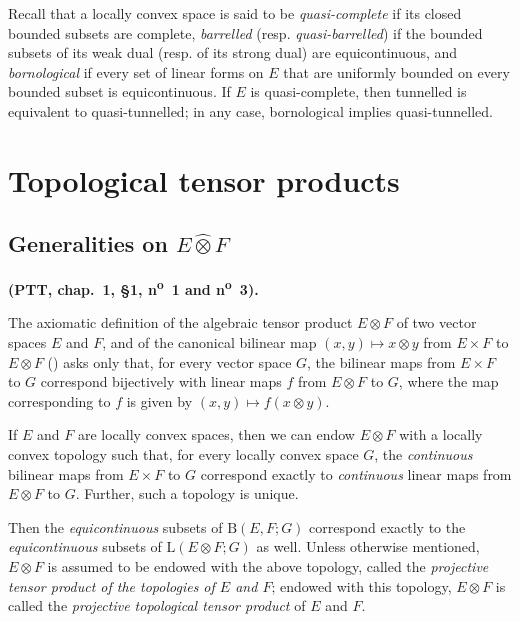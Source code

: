 \documentclass{article}
\theoremstyle{plain}
\newenvironment{theorem}[1]
    {\renewcommand\theinnercustomtheorem{#1}\innercustomtheorem}
    {\endinnercustomtheorem}
\newcommand{\BB}{\mathrm{B}}
\newcommand{\LL}{\mathrm{L}}
\newcommand{\hotimes}{\widehat{\otimes}}
\newcommand{\oldpage}[1]{\marginpar{\footnotesize$\Big\vert$ \textit{p.~#1}}}
\begin{document}
Recall that a locally convex space is said to be \emph{quasi-complete} if its closed bounded subsets are complete, \emph{barrelled} (resp. \emph{quasi-barrelled}) if the bounded subsets of its weak dual (resp. of its strong dual) are equicontinuous, and \emph{bornological} if every set of linear forms on $E$ that are uniformly bounded on every bounded subset is equicontinuous.
If $E$ is quasi-complete, then tunnelled is equivalent to quasi-tunnelled;
in any case, bornological implies quasi-tunnelled.



\section{Topological tensor products}
\label{section:topological-tensor-products}
\oldpage{76}

\subsection{Generalities on \texorpdfstring{$E\hotimes F$}{EF}}
\label{subsection:generalities-on-E-hotimes-F}

\textbf{(PTT, chap.~1, §1, n\textsuperscript{o}~1 and n\textsuperscript{o}~3).}

The axiomatic definition of the algebraic tensor product $E\otimes F$ of two vector spaces $E$ and $F$, and of the canonical bilinear map $(x,y)\mapsto x\otimes y$ from $E\times F$ to $E\otimes F$ (\cite{1}) asks only that, for every vector space $G$, the bilinear maps from $E\times F$ to $G$ correspond bijectively with linear maps $f$ from $E\otimes F$ to $G$, where the map corresponding to $f$ is given by $(x,y)\mapsto f(x\otimes y)$.

\begin{theorem}{1}
\label{theorem1}
  If $E$ and $F$ are locally convex spaces, then we can endow $E\otimes F$ with a locally convex topology such that, for every locally convex space $G$, the \emph{continuous} bilinear maps from $E\times F$ to $G$ correspond exactly to \emph{continuous} linear maps from $E\otimes F$ to $G$.
  Further, such a topology is unique.
\end{theorem}

Then the \emph{equicontinuous} subsets of $\BB(E,F;G)$ correspond exactly to the \emph{equicontinuous} subsets of $\LL(E\otimes F;G)$ as well.
Unless otherwise mentioned, $E\otimes F$ is assumed to be endowed with the above topology, called the \emph{projective tensor product of the topologies of $E$ and $F$};
endowed with this topology, $E\otimes F$ is called the \emph{projective topological tensor product} of $E$ and $F$.
\end{document}
